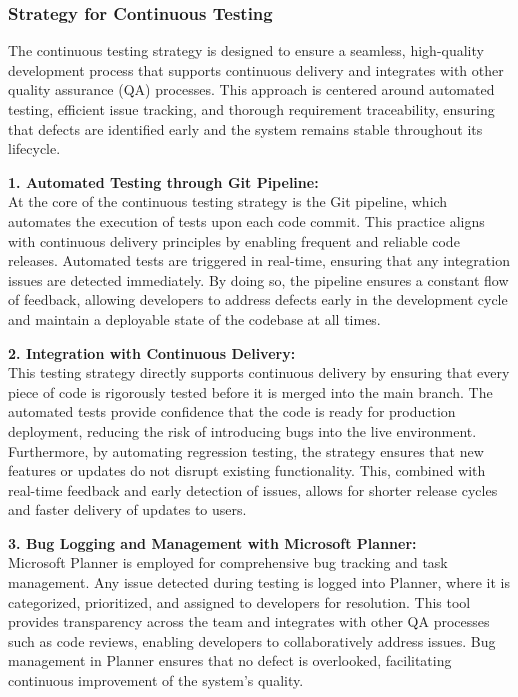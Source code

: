 \documentclass{article}
\begin{document}
\subsubsection{Strategy for Continuous Testing}

The continuous testing strategy is designed to ensure a seamless, high-quality development process that supports continuous delivery and integrates with other quality assurance (QA) processes. This approach is centered around automated testing, efficient issue tracking, and thorough requirement traceability, ensuring that defects are identified early and the system remains stable throughout its lifecycle.

\textbf{1. Automated Testing through Git Pipeline:}\\
At the core of the continuous testing strategy is the Git pipeline, which automates the execution of tests upon each code commit. This practice aligns with continuous delivery principles by enabling frequent and reliable code releases. Automated tests are triggered in real-time, ensuring that any integration issues are detected immediately. By doing so, the pipeline ensures a constant flow of feedback, allowing developers to address defects early in the development cycle and maintain a deployable state of the codebase at all times.

\textbf{2. Integration with Continuous Delivery:}\\
This testing strategy directly supports continuous delivery by ensuring that every piece of code is rigorously tested before it is merged into the main branch. The automated tests provide confidence that the code is ready for production deployment, reducing the risk of introducing bugs into the live environment. Furthermore, by automating regression testing, the strategy ensures that new features or updates do not disrupt existing functionality. This, combined with real-time feedback and early detection of issues, allows for shorter release cycles and faster delivery of updates to users.

\textbf{3. Bug Logging and Management with Microsoft Planner:}\\
Microsoft Planner is employed for comprehensive bug tracking and task management. Any issue detected during testing is logged into Planner, where it is categorized, prioritized, and assigned to developers for resolution. This tool provides transparency across the team and integrates with other QA processes such as code reviews, enabling developers to collaboratively address issues. Bug management in Planner ensures that no defect is overlooked, facilitating continuous improvement of the system's quality.
\end{document}
